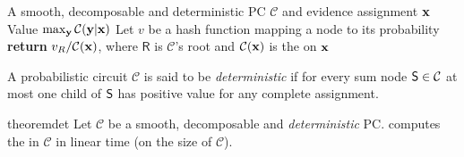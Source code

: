 \begin{algorithm}[t]
  \caption{}\label{alg:map}
  \begin{algorithmic}[1]
    \Require A smooth, decomposable and deterministic PC $\mathcal{C}$ and evidence assignment $\mathbf{x}$
    \Ensure Value $\max_{\mathbf{y}}\mathcal{C}(\mathbf{y}|\mathbf{x})$
    \State Let $v$ be a hash function mapping a node to its probability
    \EndFor%
    \State \textbf{return} $v_{\normalfont{R}}/\mathcal{C}(\mathbf{x})$, where $\textsf{R}$ is
    $\mathcal{C}$'s root and $\mathcal{C}(\mathbf{x})$ is the \evi{} on $\mathbf{x}$
  \end{algorithmic}
\end{algorithm}

\begin{definition}[Determinism]
  A probabilistic circuit $\mathcal{C}$ is said to be \emph{deterministic} if for every sum node
  $\operatorname{\textup{\textsf{S}}}\in\mathcal{C}$ at most one child of $\operatorname{\textup{\textsf{S}}}$ has positive value for any complete assignment.
\end{definition}

\begin{restatable}{theorem}{det}
  \label{thm:det}
  Let $\mathcal{C}$ be a smooth, decomposable and \emph{deterministic} PC.
  \textup{} computes the \map{} in $\mathcal{C}$ in linear time (on the size
  of $\mathcal{C}$).
\end{restatable}

